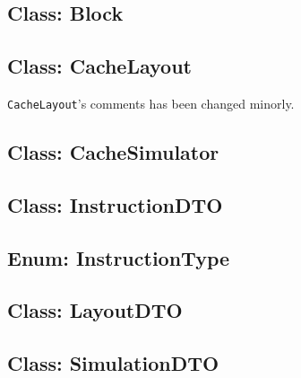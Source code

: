 \documentclass[a4paper]{scrreprt}
\begin{document}
\subsection{Class: Block}
\label{subsec:block.java}



\subsection{Class: CacheLayout}
\label{subsec:cachelayout.java}

\texttt{CacheLayout}'s comments has been changed minorly.



\subsection{Class: CacheSimulator}
\label{subsec:cachesimulator.java}



\subsection{Class: InstructionDTO}
\label{subsec:instructiondto.java}



\subsection{Enum: InstructionType}
\label{subsec:instructiontype.java}



\subsection{Class: LayoutDTO}
\label{subsec:layoutdto.java}



\subsection{Class: SimulationDTO}
\label{subsec:simulationdto.java}
\end{document}
